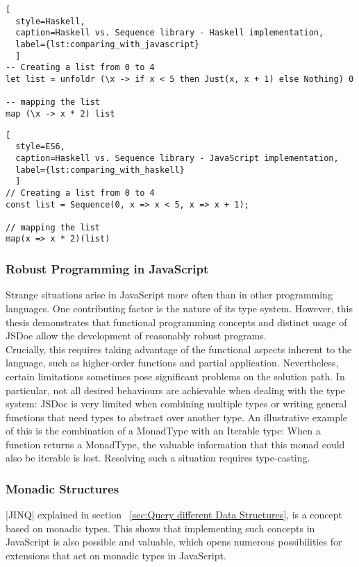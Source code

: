 \begin{lstlisting}[
  style=Haskell, 
  caption=Haskell vs. Sequence library - Haskell implementation, 
  label={lst:comparing_with_javascript}
  ]
-- Creating a list from 0 to 4
let list = unfoldr (\x -> if x < 5 then Just(x, x + 1) else Nothing) 0

-- mapping the list
map (\x -> x * 2) list 
\end{lstlisting}

\begin{lstlisting}[
  style=ES6, 
  caption=Haskell vs. Sequence library - JavaScript implementation,
  label={lst:comparing_with_haskell}
  ]
// Creating a list from 0 to 4
const list = Sequence(0, x => x < 5, x => x + 1);

// mapping the list
map(x => x * 2)(list)
\end{lstlisting}
\subsubsection{Robust Programming in JavaScript}
\label{subsub:Robust Programming in JavaScript}
Strange situations arise in JavaScript more often than in other programming
languages. One contributing factor is the nature of its type system. However,
this thesis demonstrates that functional programming concepts and distinct
usage of JSDoc allow the development of reasonably robust programs.\\
Crucially, this requires taking advantage of the functional aspects inherent to
the language, such as higher-order functions and partial application.
Nevertheless, certain limitations sometimes pose significant problems on the
solution path. In particular, not all desired behaviours are achievable when
dealing with the type system: JSDoc is very limited when combining multiple
types or writing general functions that need types to abstract over another
type. An illustrative example of this is the combination of a MonadType with an
Iterable type: When a function returns a MonadType, the valuable information
that this monad could also be iterable is lost. Resolving such a situation
requires type-casting.
\subsubsection{Monadic Structures}
\label{subsub:Monadic Structures}
|JINQ| explained in section ~\ref{sec:Query different Data Structures}, is a
concept based on monadic types. This shows that implementing such concepts in
JavaScript is also possible and valuable, which opens numerous possibilities
for extensions that act on monadic types in JavaScript.


